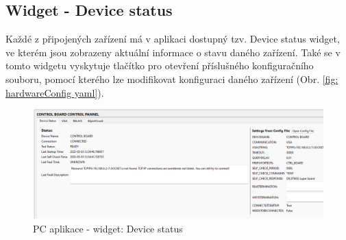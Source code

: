 \subsection{Widget - Device status}
Každé z připojených zařízení má v aplikaci dostupný tzv. Device status widget, ve kterém jsou zobrazeny aktuální informace o
stavu daného zařízení. Také se v tomto widgetu vyskytuje tlačítko pro otevření příslušného konfiguračního souboru, pomocí kterého
lze modifikovat konfiguraci daného zařízení (Obr. \ref{fig: hardwareConfig yaml}). 

\begin{figure}[ht!]
    \centering
    \includegraphics[width = 1\textwidth]{obrazky/Device_status.png}
    \caption{PC aplikace - widget:  Device status}
    \label{fig: PCAPP device status}
\end{figure}

